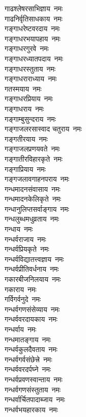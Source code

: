\begin{multicols}{2}
\begin{flushleft}
गाढश्लेषरसाभिज्ञाय~नमः\\
गाढनिर्वृतिसाधकाय~नमः\hfill{}\\
गङ्गाधरेष्टवरदाय~नमः\\
गङ्गाधरभयापहाय~नमः\\
गङ्गाधरगुरवे~नमः\\
गङ्गाधरध्यातपदाय~नमः\\
गङ्गाधरस्तुताय~नमः\\
गङ्गाधराराध्याय~नमः\\
गतस्मयाय~नमः\\
गङ्गाधरप्रियाय~नमः\\
गङ्गाधराय~नमः\\
गङ्गाम्बुसुन्दराय~नमः\hfill{}\\
गङ्गाजलरसास्वाद चतुराय~नमः\\
गङ्गतीरयाय~नमः\\
गङ्गाजलप्रणयवते~नमः\\
गङ्गातीरविहारकृते~नमः\\
गङ्गाप्रियाय~नमः\\
गङ्गजलावगाहनपराय~नमः\\
गन्धमादनसंवासाय~नमः\\
गन्धमादनकेलिकृते~नमः\\
गन्धानुलिप्तसर्वाङ्गाय~नमः\\
गन्धलुब्धमधुव्रताय~नमः\hfill{}\\
गन्धाय~नमः\\
गन्धर्वराजाय~नमः\\
गन्धर्वप्रियकृते~नमः\\
गन्धर्वविद्यातत्त्वज्ञाय~नमः\\
गन्धर्वप्रीतिवर्धनाय~नमः\\
गकारबीजनिलयाय~नमः\\
गकाराय~नमः\\
गर्विगर्वनुदे~नमः\\
गन्धर्वगणसंसेव्याय~नमः\\
गन्धर्ववरदायकाय~नमः\hfill{}\\
गन्धर्वाय~नमः\\
गन्धमातङ्गाय~नमः\\
गन्धर्वकुलदैवताय~नमः\\
गन्धर्वगर्वसंछेत्त्रे~नमः\\
गन्धर्ववरदर्पघ्ने~नमः\\
गन्धर्वप्रवणस्वान्ताय~नमः\\
गन्धर्वगणसंस्तुताय~नमः\\
गन्धर्वार्चितपादाब्जाय~नमः\\
गन्धर्वभयहारकाय~नमः\\

\end{flushleft}
\end{multicols}
